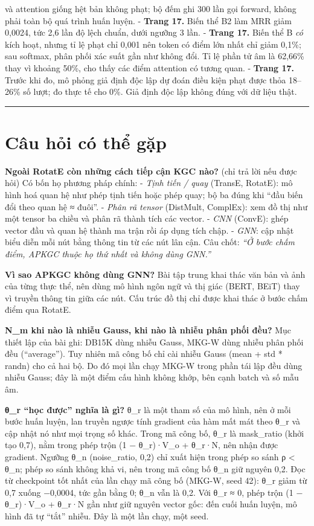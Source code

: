 \documentclass[11pt,a4paper]{article}
\newcommand{\code}[1]{{\ttfamily\small\color{codetext}#1}}
\begin{document}
và attention giống hệt bản không phạt; bộ đếm ghi 300 lần gọi forward, không phải toàn bộ quá trình huấn luyện. - \textbf{Trang 17.} Biến thể B2 làm MRR giảm 0,0024, tức 2,6 lần độ lệch chuẩn, dưới ngưỡng 3 lần. - \textbf{Trang 17.} Biến thể B \emph{có} kích hoạt, nhưng tỉ lệ phạt chỉ 0,001 nên token có điểm lớn nhất chỉ giảm 0,1\%; sau softmax, phân phối xác suất gần như không đổi. Tỉ lệ phần tử âm là 62,66\% thay vì khoảng 50\%, cho thấy các điểm attention có tương quan. - \textbf{Trang 17.} Trước khi đo, mô phỏng giả định độc lập dự đoán điều kiện phạt được thỏa 18--26\% số lượt; đo thực tế cho 0\%. Giả định độc lập không đúng với dữ liệu thật.


\medskip\noindent\rule{\linewidth}{0.3pt}\medskip

\newpage
\section*{Câu hỏi có thể gặp}

\textbf{Ngoài RotatE còn những cách tiếp cận KGC nào?} (chỉ trả lời nếu được hỏi) Có bốn họ phương pháp chính: - \emph{Tịnh tiến / quay} (TransE, RotatE): mô hình hoá quan hệ như phép tịnh tiến hoặc phép quay; bộ ba đúng khi ``đầu biến đổi theo quan hệ ≈ đuôi''. - \emph{Phân rã tensor} (DistMult, ComplEx): xem đồ thị như một tensor ba chiều và phân rã thành tích các vector. - \emph{CNN} (ConvE): ghép vector đầu và quan hệ thành ma trận rồi áp dụng tích chập. - \emph{GNN}: cập nhật biểu diễn mỗi nút bằng thông tin từ các nút lân cận. Câu chốt: \emph{``Ở bước chấm điểm, APKGC thuộc họ thứ nhất và không dùng GNN.''}


\textbf{Vì sao APKGC không dùng GNN?} Bài tập trung khai thác văn bản và ảnh của từng thực thể, nên dùng mô hình ngôn ngữ và thị giác (BERT, BEiT) thay vì truyền thông tin giữa các nút. Cấu trúc đồ thị chỉ được khai thác ở bước chấm điểm qua RotatE.


\textbf{N\_m khi nào là nhiễu Gauss, khi nào là nhiễu phân phối đều?} Mục thiết lập của bài ghi: DB15K dùng nhiễu Gauss, MKG-W dùng nhiễu phân phối đều (``average''). Tuy nhiên mã công bố chỉ cài nhiễu Gauss (\code{mean + std * randn}) cho cả hai bộ. Do đó mọi lần chạy MKG-W trong phần tái lập đều dùng nhiễu Gauss; đây là một điểm cấu hình không khớp, bên cạnh batch và số mẫu âm.


\textbf{θ\_r ``học được'' nghĩa là gì?} θ\_r là một tham số của mô hình, nên ở mỗi bước huấn luyện, lan truyền ngược tính gradient của hàm mất mát theo θ\_r và cập nhật nó như mọi trọng số khác. Trong mã công bố, θ\_r là \code{mask\_ratio} (khởi tạo 0,7), nằm trong phép trộn \code{(1 − θ\_r)·V\_o + θ\_r·N}, nên nhận được gradient. Ngưỡng θ\_n (\code{noise\_ratio}, 0,2) chỉ xuất hiện trong phép so sánh \code{ρ < θ\_n}; phép so sánh không khả vi, nên trong mã công bố θ\_n giữ nguyên 0,2. Đọc từ checkpoint tốt nhất của lần chạy mã công bố (MKG-W, seed 42): θ\_r giảm từ 0,7 xuống −0,0004, tức gần bằng 0; θ\_n vẫn là 0,2. Với θ\_r ≈ 0, phép trộn (1 − θ\_r)·V\_o + θ\_r·N gần như giữ nguyên vector gốc: đến cuối huấn luyện, mô hình đã tự ``tắt'' nhiễu. Đây là một lần chạy, một seed.
\end{document}
